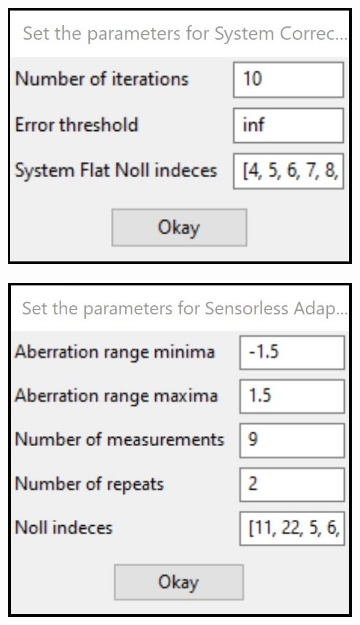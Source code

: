 \begin{figure}
	\begin{subfigure}{0.45\textwidth}
		\centering
		\includegraphics[width=\linewidth]{images/direct_wavefront_sensing_options.jpg}
		\caption{}
		\label{fig:DM_direct_wavefront_sensing_options}
	\end{subfigure}
	\begin{subfigure}{0.35\textwidth}
		\centering
		\includegraphics[width=\linewidth]{images/sensorless_ao_parameters.jpg}
		\caption{}
		\label{fig:DM_sensorless_ao_parameters}

\end{subfigure}
\end{figure}
